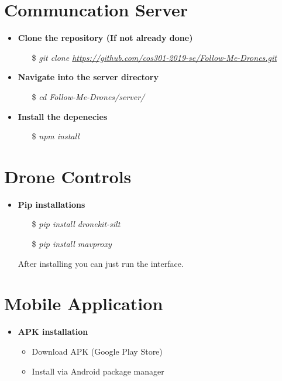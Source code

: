 \section{Communcation Server}
\begin{itemize}
    \item \textbf{Clone the repository (If not already done)}
        \begin{itemize}
            \item[\$] \textit{git clone \url{https://github.com/cos301-2019-se/Follow-Me-Drones.git}}
        \end{itemize}
    \item \textbf{Navigate into the server directory}
        \begin{itemize}
            \item[\$] \textit{cd Follow-Me-Drones/server/}
        \end{itemize}
    \item \textbf{Install the depenecies}
        \begin{itemize}
            \item[\$] \textit{npm install}
        \end{itemize}
\end{itemize}

\section{Drone Controls}

\begin{itemize}
    \item \textbf{Pip installations}
        \begin{itemize}
            \item[\$] \textit{pip install dronekit-silt}
            \item[\$] \textit{pip install mavproxy} 
        \end{itemize}
        After installing you can just run the interface.
\end{itemize}

\section{Mobile Application}

\begin{itemize}
	\item \textbf{APK installation}
        \begin{itemize}
			\item  Download APK (Google Play Store) 
			\item  Install via Android package manager 
        \end{itemize}
\end{itemize}
